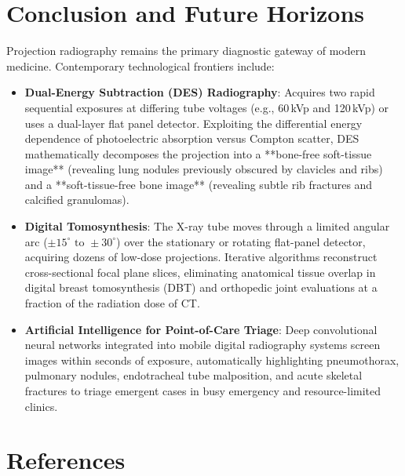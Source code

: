\documentclass[11pt,a4paper]{article}
\begin{document}
\section{Conclusion and Future Horizons}

Projection radiography remains the primary diagnostic gateway of modern medicine. Contemporary technological frontiers include:
\begin{itemize}[leftmargin=*]
    \item \textbf{Dual-Energy Subtraction (DES) Radiography}: Acquires two rapid sequential exposures at differing tube voltages (e.g., 60\,kVp and 120\,kVp) or uses a dual-layer flat panel detector. Exploiting the differential energy dependence of photoelectric absorption versus Compton scatter, DES mathematically decomposes the projection into a **bone-free soft-tissue image** (revealing lung nodules previously obscured by clavicles and ribs) and a **soft-tissue-free bone image** (revealing subtle rib fractures and calcified granulomas).
    \item \textbf{Digital Tomosynthesis}: The X-ray tube moves through a limited angular arc ($\pm 15^\circ\text{ to }\pm 30^\circ$) over the stationary or rotating flat-panel detector, acquiring dozens of low-dose projections. Iterative algorithms reconstruct cross-sectional focal plane slices, eliminating anatomical tissue overlap in digital breast tomosynthesis (DBT) and orthopedic joint evaluations at a fraction of the radiation dose of CT.
    \item \textbf{Artificial Intelligence for Point-of-Care Triage}: Deep convolutional neural networks integrated into mobile digital radiography systems screen images within seconds of exposure, automatically highlighting pneumothorax, pulmonary nodules, endotracheal tube malposition, and acute skeletal fractures to triage emergent cases in busy emergency and resource-limited clinics.
\end{itemize}

\section*{References}
\end{document}
